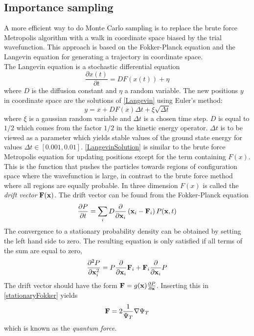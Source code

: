 \documentclass[english, a4paper]{article}
\begin{document}
\subsection{Importance sampling}

A more efficient way to do Monte Carlo sampling is to replace the brute force Metropolis algorithm
with a walk in coordinate space biased by the trial wavefunction. This approach is based on the 
Fokker-Planck equation and the Langevin equation for generating a trajectory in coordinate space. \\

\noindent The Langevin equation is a stochastic differential equation
\begin{equation}
 \frac{\partial x(t)}{\partial t} = D F(x(t)) + \eta
 \label{Langevin}
\end{equation}
where $D$ is the diffusion constant and $\eta$ a random variable.
The new positions $y$ in coordinate space are the solutions of \eqref{Langevin} using Euler's method:
\begin{equation}
 y = x + DF(x)\Delta t + \xi \sqrt{\Delta t}
 \label{LangevinSolution}
\end{equation}
where $\xi$ is a gaussian random variable and $\Delta t$ is a chosen time step. $D$ is equal to $1/2$
which comes from the factor $1/2$ in the kinetic energy operator. $\Delta t$ is to be viewed as a
parameter which yields stable values of the ground state energy for values $\Delta t \in [0.001, 0.01]$.
\eqref{LangevinSolution} is similar to the brute force Metropolis equation for updating positions except for the
term  containing $F(x)$. This is the function that pushes the particles towards regions of configuration space
where the wavefunction is large, in contrast to the brute force method where all regions are equally probable. 
In three dimension $F(x)$ is called the \textit{drift vector} ${\bf F}({\bf x})$.
The drift vector can be found from the
Fokker-Planck equation
\begin{equation}
 \frac{\partial P}{\partial t} = \sum_i D \frac{\partial}{\partial {\bf x}_i}
 \left( {\bf x}_i - {\bf F}_i \right) P({\bf x}, t)
 \label{FokkerPlanck}
\end{equation}
The convergence to a stationary probability density can be obtained by setting the left hand side to zero. 
The resulting equation is only satisfied if all terms of the sum are equal to zero, 
\begin{equation}
 \frac{\partial^2 P}{\partial {\bf x}_i^2} = P \frac{\partial}{\partial {\bf x}_i} {\bf F}_i
 + {\bf F}_i \frac{\partial}{\partial {\bf x}_i} P
 \label{stationaryFokker}
\end{equation}
The drift vector should have the form ${\bf F} = g({\bf x}) \frac{\partial P}{\partial {\bf x}}$. Inserting this in
\eqref{stationaryFokker} yields 
\begin{equation}
 {\bf F} = 2 \frac{1}{\Psi_T} \nabla \Psi_T
 \label{quantumForce}
\end{equation}
which is known as the \textit{quantum force}. \\
\end{document}
